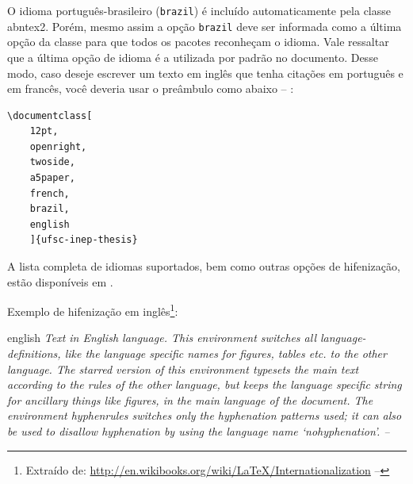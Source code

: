 
O idioma português-brasileiro (\texttt{brazil}) é incluído automaticamente pela
classe \textsf{abntex2}. Porém, mesmo assim a opção \texttt{brazil} deve ser
informada como a última opção da classe para que todos os pacotes reconheçam o
idioma. Vale ressaltar que a última opção de idioma é a utilizada por padrão no
documento. Desse modo, caso deseje escrever um texto em inglês que tenha
citações em português e em francês, você deveria usar o preâmbulo como abaixo -- \showfont:

\begin{verbatim}
\documentclass[
    12pt,
    openright,
    twoside,
    a5paper,
    french,
    brazil,
    english
    ]{ufsc-inep-thesis}
\end{verbatim}

A lista completa de idiomas suportados, bem como outras opções de hifenização,
estão disponíveis em \textcite[p.~5-6]{babel}.

Exemplo de hifenização em inglês\footnote{Extraído de:
    \url{http://en.wikibooks.org/wiki/LaTeX/Internationalization} -- \showfont}:

\begin{otherlanguage*}{english}
    \textit{Text in English language. This environment switches all language\hyp{}definitions,
        like the language specific names for figures, tables etc. to the other
        language. The starred version of this environment typesets the main text
        according to the rules of the other language, but keeps the language specific
        string for ancillary things like figures, in the main language of the document.
        The environment hyphenrules switches only the hyphenation patterns used; it can
        also be used to disallow hyphenation by using the language name
        `nohyphenation'. -- \showfont}
\end{otherlanguage*}

